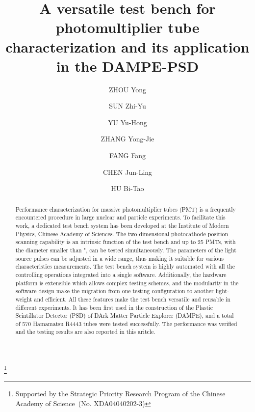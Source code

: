 \documentclass{nst}
\providecommand{\DIFadd}[1]{{\protect\color{yellow} \sf #1}} %
\providecommand{\DIFaddbegin}{} %
\providecommand{\DIFaddend}{} %
\providecommand{\DIFdelbegin}{} %
\providecommand{\DIFdelend}{} %
\begin{document}
\title{A versatile test bench for photomultiplier tube characterization and its application in the DAMPE-PSD}\thanks{Supported by the Strategic Priority Research Program of the Chinese Academy of Science~(No. XDA04040202-3)}

\author[周勇]{ZHOU Yong}
\author[孙志宇]{SUN Zhi-Yu}
\author[余玉洪]{YU Yu-Hong}
\author[张永杰]{ZHANG Yong-Jie}
\author[方芳]{FANG Fang}
\author[陈俊岭]{CHEN Jun-Ling}
\author[胡碧涛]{HU Bi-Tao}


\begin{abstract}
 Performance characterization for massive photomultiplier tubes (PMT) is a frequently encountered procedure in large nuclear and particle experiments. To facilitate this work, a dedicated test bench system has been developed at the Institute of Modern Physics, Chinese Academy of Sciences.
 The two-dimensional photocathode position scanning capability is an intrinsic function of the test bench and up to 25 PMTs, with the diameter smaller than \DIFdelbegin \DIFdelend \DIFaddbegin \DIFadd{2"}\DIFaddend , can be tested simultaneously.
 The parameters of the light source pulses can be adjusted in a wide range, thus making it suitable for various characteristics measurements.
 The test bench system is highly automated with all the controlling operations integrated into a single software. 
 Additionally, the hardware platform is extensible which allows complex testing schemes, and the modularity in the software design make the migration from one testing configuration to another light-weight and efficient.
 All these features make the test bench versatile and reusable in different experiments.
 It has been first used in the construction of the Plastic Scintillator Detector (PSD) of DArk Matter Particle Explorer (DAMPE), and a total of 570 Hamamatsu R4443 tubes were tested successfully. The performance was verified and the testing results are also reported in this aritcle.
\end{abstract}
\end{document}
